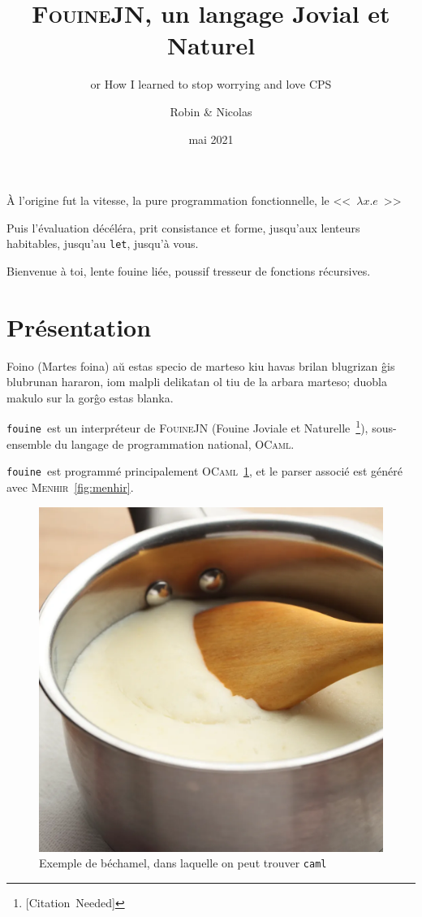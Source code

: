 \documentclass[a4, 11pt, titlepage]{scrartcl}
\title{\textsc{FouineJN}, un langage Jovial et Naturel}
\subtitle{or How I learned to stop worrying and love CPS}
\author{Robin \bsc{Jourde} \& Nicolas \bsc{Nardino}}
\date{mai 2021}
\newcommand{\fouine}[0]{\texttt{fouine}}
\begin{document}
\maketitle

\begin{center}
  \small
  
\end{center}

\newpage

\epigraph{
À l'origine fut la vitesse, la pure programmation fonctionnelle, le
<<~$\lambda x.e$~>>

Puis l'évaluation décéléra, prit consistance et forme, jusqu'aux lenteurs
habitables, jusqu'au \texttt{let}, jusqu'à vous.

Bienvenue à toi, lente fouine liée, poussif tresseur de fonctions
récursives.}{\cite{LaHorde}}




\tableofcontents

\section{Présentation}\label{sec:1}

Foino (Martes foina) aŭ estas specio de marteso kiu havas brilan
blugrizan ĝis blubrunan hararon, iom malpli delikatan ol tiu de la
arbara marteso; duobla makulo sur la gorĝo estas blanka.~\cite{wiki:001}

\fouine\ est un interpréteur de \textsc{FouineJN} (Fouine
Joviale et Naturelle~\footnote{[Citation~Needed]}), sous-ensemble du
langage de programmation national, \textsc{OCaml}.

\fouine\ est programmé principalement \textsc{OCaml}~\ref{fig:ocaml},
et le parser associé est généré avec \textsc{Menhir}~\ref{fig:menhir}.

\begin{figure}[H]
  \centering
  \includegraphics[width=0.33\linewidth]{figures/bechamel.png}
  \caption{\label{fig:ocaml} Exemple de béchamel, dans laquelle on
    peut trouver \texttt{caml}}
\end{figure}
\end{document}
